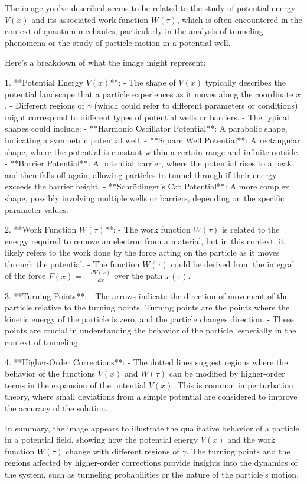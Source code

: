 The image you've described seems to be related to the study of potential energy \( V(x) \) and its associated work function \( W(\tau) \), which is often encountered in the context of quantum mechanics, particularly in the analysis of tunneling phenomena or the study of particle motion in a potential well.

Here's a breakdown of what the image might represent:

1. **Potential Energy \( V(x) \)**:
   - The shape of \( V(x) \) typically describes the potential landscape that a particle experiences as it moves along the coordinate \( x \).
   - Different regions of \( \gamma \) (which could refer to different parameters or conditions) might correspond to different types of potential wells or barriers.
   - The typical shapes could include:
     - **Harmonic Oscillator Potential**: A parabolic shape, indicating a symmetric potential well.
     - **Square Well Potential**: A rectangular shape, where the potential is constant within a certain range and infinite outside.
     - **Barrier Potential**: A potential barrier, where the potential rises to a peak and then falls off again, allowing particles to tunnel through if their energy exceeds the barrier height.
     - **Schrödinger's Cat Potential**: A more complex shape, possibly involving multiple wells or barriers, depending on the specific parameter values.

2. **Work Function \( W(\tau) \)**:
   - The work function \( W(\tau) \) is related to the energy required to remove an electron from a material, but in this context, it likely refers to the work done by the force acting on the particle as it moves through the potential.
   - The function \( W(\tau) \) could be derived from the integral of the force \( F(x) = -\frac{dV(x)}{dx} \) over the path \( x(\tau) \).

3. **Turning Points**:
   - The arrows indicate the direction of movement of the particle relative to the turning points. Turning points are the points where the kinetic energy of the particle is zero, and the particle changes direction.
   - These points are crucial in understanding the behavior of the particle, especially in the context of tunneling.

4. **Higher-Order Corrections**:
   - The dotted lines suggest regions where the behavior of the functions \( V(x) \) and \( W(\tau) \) can be modified by higher-order terms in the expansion of the potential \( V(x) \). This is common in perturbation theory, where small deviations from a simple potential are considered to improve the accuracy of the solution.

In summary, the image appears to illustrate the qualitative behavior of a particle in a potential field, showing how the potential energy \( V(x) \) and the work function \( W(\tau) \) change with different regions of \( \gamma \). The turning points and the regions affected by higher-order corrections provide insights into the dynamics of the system, such as tunneling probabilities or the nature of the particle's motion.